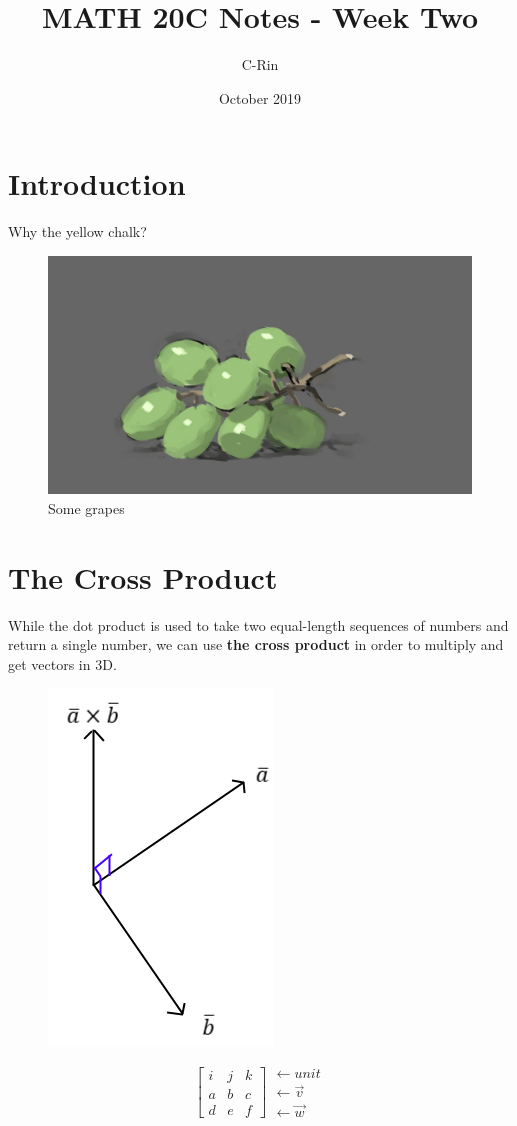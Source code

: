 \documentclass{article}
\title{MATH 20C Notes - Week Two}
\author{C-Rin}
\date{October 2019}
\begin{document}
\maketitle

\section{Introduction}
Why the yellow chalk? 
\begin{figure}[h!]
    \centering
    \includegraphics[scale = 0.1]{grapes.jpg}
    \caption{Some grapes}
    \label{}
\end{figure}

\section{The Cross Product}
While the dot product is used to take two equal-length sequences of numbers and return a single number,
we can use \textbf{the cross product} in order to multiply and get vectors in 3D.
\begin{figure}[h!]
    \centering
    \includegraphics[scale=.5]{TripleProduct.png}
    \label{}
\end{figure}
\[\begin{bmatrix}
    i&j&k\\
    a&b&c\\
    d&e&f
\end{bmatrix}\begin{matrix}
    \leftarrow unit\\
    \leftarrow \vec{v}\\
    \leftarrow \vec{w}
\end{matrix}\]
\end{document}
